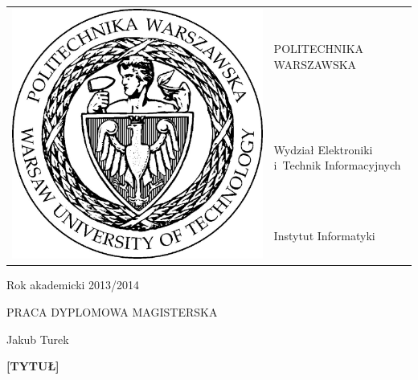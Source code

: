 \begin{titlepage}

 \begin{tabular}{ll}
  \multirow{3}{*}{\includegraphics[scale=0.3]{figures/pw.jpg}} & POLITECHNIKA WARSZAWSKA                      \\
                                                               & Wydział Elektroniki i~Technik Informacyjnych \\
                                                               & Instytut Informatyki
 \end{tabular}
 
 \begin{flushright}
  Rok akademicki 2013/2014
 \end{flushright}

 \vspace{2cm}
 
 \begin{center}
  \LARGE PRACA DYPLOMOWA MAGISTERSKA
  
  \vspace{2cm}
  
  \large Jakub Turek
  
  \vspace{2cm}
  
  \textbf{[TYTUŁ]}
 \end{center}
 

\end{titlepage}
